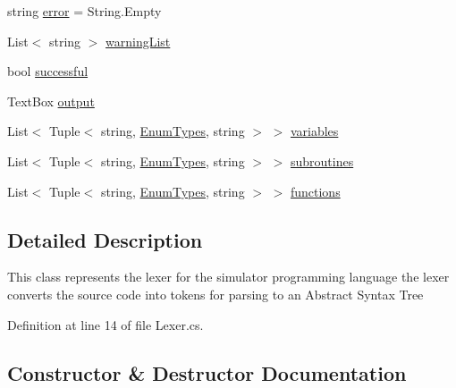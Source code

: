 \begin{DoxyCompactItemize}
\item 
string \hyperlink{class_c_p_u___o_s___simulator_1_1_compiler_1_1_frontend_1_1_lexer_a787862ffec1828f426fac010f543e31c}{error} = String.\+Empty
\item 
List$<$ string $>$ \hyperlink{class_c_p_u___o_s___simulator_1_1_compiler_1_1_frontend_1_1_lexer_ac240cede3460c43d89c4387c04f00377}{warning\+List}
\item 
bool \hyperlink{class_c_p_u___o_s___simulator_1_1_compiler_1_1_frontend_1_1_lexer_ad2b45c1eaf05bca9d992ed22a0331bae}{successful}
\item 
Text\+Box \hyperlink{class_c_p_u___o_s___simulator_1_1_compiler_1_1_frontend_1_1_lexer_ab2c4e18875ad66f9f4b1debf32e21d97}{output}
\item 
List$<$ Tuple$<$ string, \hyperlink{namespace_c_p_u___o_s___simulator_1_1_compiler_1_1_frontend_1_1_tokens_a7c0cc43763cc9d01c7d5af34d70b96ea}{Enum\+Types}, string $>$ $>$ \hyperlink{class_c_p_u___o_s___simulator_1_1_compiler_1_1_frontend_1_1_lexer_af7e42e63231b352e446b5be89623c74a}{variables}
\item 
List$<$ Tuple$<$ string, \hyperlink{namespace_c_p_u___o_s___simulator_1_1_compiler_1_1_frontend_1_1_tokens_a7c0cc43763cc9d01c7d5af34d70b96ea}{Enum\+Types}, string $>$ $>$ \hyperlink{class_c_p_u___o_s___simulator_1_1_compiler_1_1_frontend_1_1_lexer_a45c844ee9a1f5dedb94dcb4f19883d5a}{subroutines}
\item 
List$<$ Tuple$<$ string, \hyperlink{namespace_c_p_u___o_s___simulator_1_1_compiler_1_1_frontend_1_1_tokens_a7c0cc43763cc9d01c7d5af34d70b96ea}{Enum\+Types}, string $>$ $>$ \hyperlink{class_c_p_u___o_s___simulator_1_1_compiler_1_1_frontend_1_1_lexer_ab56c14f20b221345bcb9ef4bdd7d5c87}{functions}
\end{DoxyCompactItemize}


\subsection{Detailed Description}
This class represents the lexer for the simulator programming language the lexer converts the source code into tokens for parsing to an Abstract Syntax Tree 



Definition at line 14 of file Lexer.\+cs.



\subsection{Constructor \& Destructor Documentation}
\hypertarget{class_c_p_u___o_s___simulator_1_1_compiler_1_1_frontend_1_1_lexer_ad1b8ba022e0f486f963bf7f2104ef03d}{}
